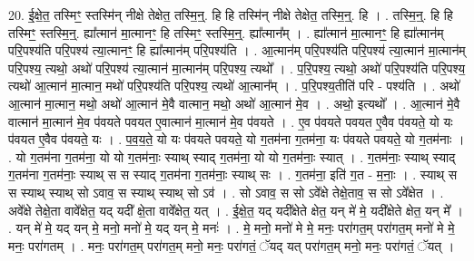\documentclass[17pt]{extarticle}
\begin{document}
20. ई॒क्षे॒त॒ तस्मिꣳ॒॒ स्तस्मि॑न् नीक्षे तेक्षेत॒ तस्मि॒न्॒. हि हि तस्मि॑न् नीक्षे तेक्षेत॒ तस्मि॒न्॒. हि । . तस्मि॒न्॒. हि हि तस्मिꣳ॒॒ स्तस्मि॒न्॒. ह्या᳚त्मान॑ मा॒त्मानꣳ॒॒ हि तस्मिꣳ॒॒ स्तस्मि॒न्॒. ह्या᳚त्मान᳚म् । . ह्या᳚त्मान॑ मा॒त्मानꣳ॒॒ हि ह्या᳚त्मान॑म् परि॒पश्य॑ति परि॒पश्य॑ त्या॒त्मानꣳ॒॒ हि ह्या᳚त्मान॑म् परि॒पश्य॑ति । . आ॒त्मान॑म् परि॒पश्य॑ति परि॒पश्य॑ त्या॒त्मान॑ मा॒त्मान॑म् परि॒पश्य॒ त्यथो॒ अथो॑ परि॒पश्य॑ त्या॒त्मान॑ मा॒त्मान॑म् परि॒पश्य॒ त्यथो᳚ । . प॒रि॒पश्य॒ त्यथो॒ अथो॑ परि॒पश्य॑ति परि॒पश्य॒ त्यथो॑ आ॒त्मान॑ मा॒त्मान॒ मथो॑ परि॒पश्य॑ति परि॒पश्य॒ त्यथो॑ आ॒त्मान᳚म् । . प॒रि॒पश्य॒तीति॑ परि - पश्य॑ति । . अथो॑ आ॒त्मान॑ मा॒त्मान॒ मथो॒ अथो॑ आ॒त्मान॑ मे॒वै वात्मान॒ मथो॒ अथो॑ आ॒त्मान॑ मे॒व । . अथो॒ इत्यथो᳚ । . आ॒त्मान॑ मे॒वै वात्मान॑ मा॒त्मान॑ मे॒व प॑वयते पवयत ए॒वात्मान॑ मा॒त्मान॑ मे॒व प॑वयते । . ए॒व प॑वयते पवयत ए॒वैव प॑वयते॒ यो यः प॑वयत ए॒वैव प॑वयते॒ यः । . प॒व॒य॒ते॒ यो यः प॑वयते पवयते॒ यो ग॒तम॑ना ग॒तम॑ना॒ यः प॑वयते पवयते॒ यो ग॒तम॑नाः । . यो ग॒तम॑ना ग॒तम॑ना॒ यो यो ग॒तम॑नाः॒ स्याथ् स्याद् ग॒तम॑ना॒ यो यो ग॒तम॑नाः॒ स्यात् । . ग॒तम॑नाः॒ स्याथ् स्याद् ग॒तम॑ना ग॒तम॑नाः॒ स्याथ् स स स्याद् ग॒तम॑ना ग॒तम॑नाः॒ स्याथ् सः । . ग॒तम॑ना॒ इति॑ ग॒त - म॒नाः॒ । . स्याथ् स स स्याथ् स्याथ् सो ऽवाव॒ स स्याथ् स्याथ् सो ऽव॑ । . सो ऽवाव॒ स सो ऽवे᳚क्षे तेक्षे॒ताव॒ स सो ऽवे᳚क्षेत । . अवे᳚क्षे तेक्षे॒ता वावे᳚क्षेत॒ यद् यदी᳚ क्षे॒ता वावे᳚क्षेत॒ यत् । . ई॒क्षे॒त॒ यद् यदी᳚क्षेते क्षेत॒ यन् मे॑ मे॒ यदी᳚क्षेते क्षेत॒ यन् मे᳚ । . यन् मे॑ मे॒ यद् यन् मे॒ मनो॒ मनो॑ मे॒ यद् यन् मे॒ मनः॑ । . मे॒ मनो॒ मनो॑ मे मे॒ मनः॒ परा॑गत॒म् परा॑गत॒म् मनो॑ मे मे॒ मनः॒ परा॑गतम् । . मनः॒ परा॑गत॒म् परा॑गत॒म् मनो॒ मनः॒ परा॑गतं॒ ॅयद् यत् परा॑गत॒म् मनो॒ मनः॒ परा॑गतं॒ ॅयत् । \newline
\end{document}
